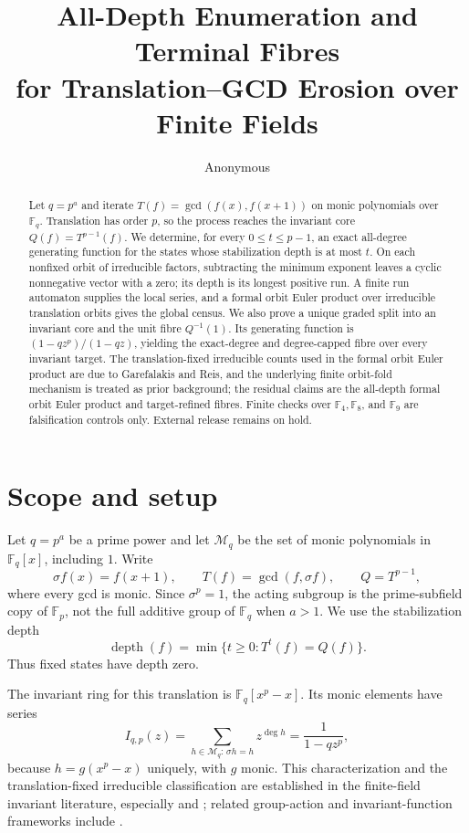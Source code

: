 \documentclass[10pt,a4paper]{amsart}
\title[Translation--GCD depth and fibres]{All-Depth Enumeration and Terminal Fibres\\
for Translation--GCD Erosion over Finite Fields}
\author{Anonymous}
\date{}
\theoremstyle{definition}
\theoremstyle{remark}
\newcommand{\F}{\mathbb F}
\newcommand{\Mon}{\mathcal M}
\newcommand{\depth}{\operatorname{depth}}
\begin{document}
\begin{abstract}
Let $q=p^a$ and iterate $T(f)=\gcd(f(x),f(x+1))$ on monic
polynomials over $\F_q$.  Translation has order $p$, so the process reaches
the invariant core $Q(f)=T^{p-1}(f)$.  We determine, for every
$0\leq t\leq p-1$, an exact all-degree generating function for the states
whose stabilization depth is at most $t$.  On each nonfixed orbit of
irreducible factors, subtracting the minimum exponent leaves a cyclic
nonnegative vector with a zero; its depth is its longest positive run.  A
finite run automaton supplies the local series, and a formal orbit Euler product over
irreducible translation orbits gives the global census.  We also prove a
unique graded split into an invariant core and the unit fibre $Q^{-1}(1)$.
Its generating function is $(1-qz^p)/(1-qz)$, yielding the exact-degree and
degree-capped fibre over every invariant target.  The translation-fixed
irreducible counts used in the formal orbit Euler product are due to Garefalakis and Reis, and
the underlying finite orbit-fold mechanism is treated as prior background;
the residual claims are the all-depth formal orbit Euler product and target-refined fibres.
Finite checks over $\F_4,\F_8$, and $\F_9$ are falsification controls only.
External release remains on hold.
\end{abstract}

\maketitle

\section{Scope and setup}

Let $q=p^a$ be a prime power and let $\Mon_q$ be the set of monic
polynomials in $\F_q[x]$, including $1$.  Write
\[
  \sigma f(x)=f(x+1),\qquad
  T(f)=\gcd(f,\sigma f),\qquad Q=T^{p-1},
\]
where every gcd is monic.  Since $\sigma^p=1$, the acting subgroup is the
prime-subfield copy of $\F_p$, not the full additive group of $\F_q$ when
$a>1$.  We use the stabilization depth
\[
 \depth(f)=\min\{t\geq0:T^t(f)=Q(f)\}.
\]
Thus fixed states have depth zero.

The invariant ring for this translation is
$\F_q[x^p-x]$.  Its monic elements have series
\begin{equation}\label{eq:invariant-series}
 I_{q,p}(z)=\sum_{h\in\Mon_q:\,\sigma h=h}z^{\deg h}
           =\frac{1}{1-qz^p},
\end{equation}
because $h=g(x^p-x)$ uniquely, with $g$ monic.  This characterization and
the translation-fixed irreducible classification are established in the
finite-field invariant literature, especially
\citet{Garefalakis2011} and \citet{Reis2018}; related group-action and
invariant-function frameworks include
\cite{Reimers2018,GowMcGuire2022,Schulz2023}.
\end{document}
